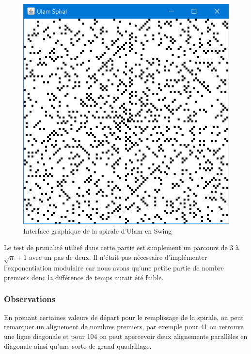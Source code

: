 \begin{figure}[H]
\begin{center}
\includegraphics[scale=0.5]{images/swing_spirale.PNG}
\end{center}
\caption{Interface graphique de la spirale d'Ulam en Swing}
\end{figure}

Le test de primalité utilisé dans cette partie est simplement un parcours de 3 à $\sqrt{n} + 1$ avec un pas de deux. Il n'était pas nécessaire d'implémenter l'exponentiation modulaire car nous avons qu'une petite partie de nombre premiers donc la différence de temps aurait été faible.\\
\newpage


\subsubsection{Observations}
En prenant certaines valeurs de départ pour le remplissage de la spirale, on peut remarquer un alignement de nombres premiers, par exemple pour 41 on retrouve une ligne diagonale et pour 104 on peut apercevoir deux alignements parallèles en diagonale ainsi qu'une sorte de grand quadrillage.

